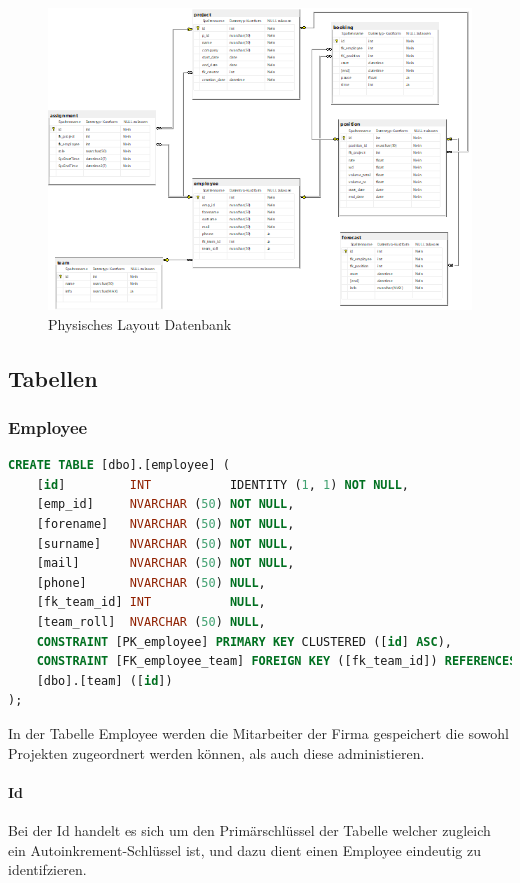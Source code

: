 \documentclass{article}
\begin{document}
\begin{figure}[h]
    \centering
    \includegraphics[width= \textwidth]{images/datenbankphysisches-Layout.png}
    \caption{Physisches Layout Datenbank}
    \label{fig:beispiel}
\end{figure}

\newpage

\subsection{Tabellen}

\subsubsection{Employee}
\label{subsubsec:Employee}
\begin{lstlisting}[language=Sql, caption= Create Table Statement für Employee Table]
    CREATE TABLE [dbo].[employee] (
    [id]         INT           IDENTITY (1, 1) NOT NULL,
    [emp_id]     NVARCHAR (50) NOT NULL,
    [forename]   NVARCHAR (50) NOT NULL,
    [surname]    NVARCHAR (50) NOT NULL,
    [mail]       NVARCHAR (50) NOT NULL,
    [phone]      NVARCHAR (50) NULL,
    [fk_team_id] INT           NULL,
    [team_roll]  NVARCHAR (50) NULL,
    CONSTRAINT [PK_employee] PRIMARY KEY CLUSTERED ([id] ASC),
    CONSTRAINT [FK_employee_team] FOREIGN KEY ([fk_team_id]) REFERENCES 
    [dbo].[team] ([id])
);
        \end{lstlisting}

In der Tabelle Employee werden die Mitarbeiter der Firma gespeichert die sowohl
Projekten zugeordnert werden können, als auch diese administieren.
\paragraph{Id}
Bei der Id handelt es sich um den Primärschlüssel der Tabelle welcher zugleich
ein Autoinkrement-Schlüssel ist, und dazu dient einen Employee eindeutig zu
identifzieren.
\end{document}
